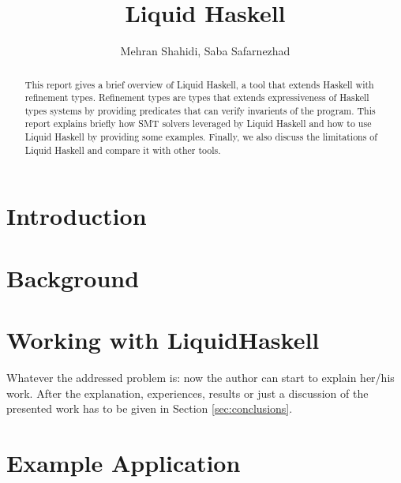\documentclass[]{rptuseminar}
\title{Liquid Haskell}
\author{Mehran Shahidi, Saba Safarnezhad
  \institute{Rheinland-Pfälzische Technische Universität Kaiserslautern-Landau, Department of Computer Science}}
\begin{document}

\maketitle


\begin{abstract}
  This report gives a brief overview of Liquid Haskell, a tool that extends Haskell with refinement types. Refinement types are types that extends expressiveness of Haskell types systems by providing predicates that can verify
  invarients of the program. This report explains briefly how SMT solvers leveraged by Liquid Haskell and how to use Liquid Haskell by providing some examples. Finally, we also discuss the limitations of Liquid Haskell and compare it with other tools.
\end{abstract}


\section{Introduction}
\label{sec:introduction}


\section{Background}
\label{sec:relatedwork}

\section{Working with LiquidHaskell}
  \label{sec:solution}
  
  Whatever the addressed problem is: now the author can start to explain her/his work.
  After the explanation, experiences, results or just a discussion of the presented work has to be given in Section \ref{sec:conclusions}.
  
\section{Example Application}

\end{document}
